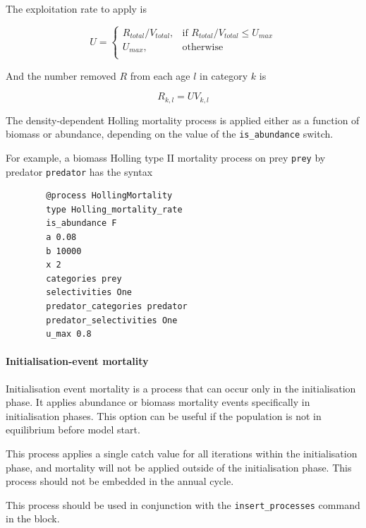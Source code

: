 The exploitation rate to apply is

\begin{equation}
	U = \begin{cases}
		R_{total}/V_{total}, & \text{if $R_{total}/V_{total} \leq U_{max}$} \\
		U_{max}, & \text{otherwise}\\
	\end{cases}
\end{equation}

And the number removed $R$ from each age $l$ in category $k$ is

\begin{equation}
	R_{k,l} = U V_{k,l}
\end{equation}

The density-dependent Holling mortality process is applied either as a function of biomass or abundance, depending on the value of the \texttt{is\_abundance} switch.

For example, a biomass Holling type II mortality process on prey \texttt{prey} by predator \texttt{predator} has the syntax

{\small{\begin{verbatim}
		@process HollingMortality
		type Holling_mortality_rate
		is_abundance F
		a 0.08
		b 10000
		x 2
		categories prey
		selectivities One
		predator_categories predator
		predator_selectivities One
		u_max 0.8
\end{verbatim}}}

\paragraph{Initialisation-event mortality}\label{sec:Process-MortalityInitialisationEvent}\label{sec:Process-MortalityInitialisationEventBiomass}

Initialisation event mortality is a process that can occur only in the initialisation phase. It applies abundance or biomass mortality events specifically in initialisation phases. This option can be useful if the population is not in equilibrium before model start.

This process applies a single catch value for all iterations within the initialisation phase, and mortality will not be applied outside of the initialisation phase. This process should not be embedded in the annual cycle.

This process should be used in conjunction with the \texttt{insert\_processes} command in the  block.


